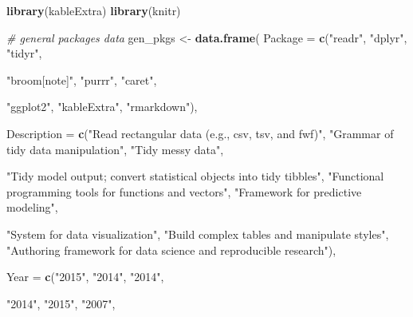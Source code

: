 \documentclass[10pt,letterpaper]{article}
\newenvironment{Shaded}{\begin{snugshade}}{\end{snugshade}}
\newcommand{\CommentTok}[1]{\textcolor[rgb]{0.56,0.35,0.01}{\textit{#1}}}
\newcommand{\DataTypeTok}[1]{\textcolor[rgb]{0.13,0.29,0.53}{#1}}
\newcommand{\KeywordTok}[1]{\textcolor[rgb]{0.13,0.29,0.53}{\textbf{#1}}}
\newcommand{\NormalTok}[1]{#1}
\newcommand{\StringTok}[1]{\textcolor[rgb]{0.31,0.60,0.02}{#1}}
\begin{document}
\begin{Shaded}
\begin{Highlighting}[]
\KeywordTok{library}\NormalTok{(kableExtra)}
\KeywordTok{library}\NormalTok{(knitr)}
\end{Highlighting}
\end{Shaded}

\begin{Shaded}
\begin{Highlighting}[]
\CommentTok{# general packages data}
\NormalTok{gen_pkgs <-}\StringTok{ }\KeywordTok{data.frame}\NormalTok{(}
  \DataTypeTok{Package =} \KeywordTok{c}\NormalTok{(}\StringTok{"readr"}\NormalTok{, }
              \StringTok{"dplyr"}\NormalTok{,}
              \StringTok{"tidyr"}\NormalTok{,}
              
              \StringTok{"broom[note]"}\NormalTok{,}
              \StringTok{"purrr"}\NormalTok{,}
              \StringTok{"caret"}\NormalTok{, }
              
              \StringTok{"ggplot2"}\NormalTok{, }
              \StringTok{"kableExtra"}\NormalTok{, }
              \StringTok{"rmarkdown"}\NormalTok{),}
  
  \DataTypeTok{Description =} \KeywordTok{c}\NormalTok{(}\StringTok{"Read rectangular data (e.g., csv, tsv, and fwf)"}\NormalTok{, }
                  \StringTok{"Grammar of tidy data manipulation"}\NormalTok{,}
                  \StringTok{"Tidy messy data"}\NormalTok{,}
                  
                  \StringTok{"Tidy model output; convert statistical objects into tidy tibbles"}\NormalTok{, }
                  \StringTok{"Functional programming tools for functions and vectors"}\NormalTok{,}
                  \StringTok{"Framework for predictive modeling"}\NormalTok{,}
                  
                  \StringTok{"System for data visualization"}\NormalTok{, }
                  \StringTok{"Build complex tables and manipulate styles"}\NormalTok{,}
                  \StringTok{"Authoring framework for data science and reproducible research"}\NormalTok{),}
  
  \DataTypeTok{Year =} \KeywordTok{c}\NormalTok{(}\StringTok{"2015"}\NormalTok{,}
           \StringTok{"2014"}\NormalTok{,}
           \StringTok{"2014"}\NormalTok{,}
  
           \StringTok{"2014"}\NormalTok{,}
           \StringTok{"2015"}\NormalTok{,}
           \StringTok{"2007"}\NormalTok{,}
                    

\end{Highlighting}
\end{Shaded}
\end{document}
